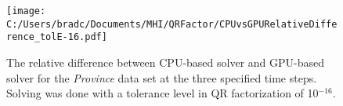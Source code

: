 \documentclass[11pt,letterpaper]{article}
\begin{document}
\begin{figure}[!ht]
    \centering
    \texttt{[image: C:/Users/bradc/Documents/MHI/QRFactor/CPUvsGPURelativeDifference\_tolE-16.pdf]}
    \caption{The relative difference between CPU-based solver and GPU-based solver for the \emph{Province} data set at the three
    specified time steps. Solving was done with a tolerance level in QR factorization of 10$^{-16}$.}
    \label{f:cpuvsgpu}
\end{figure}
\end{document}
